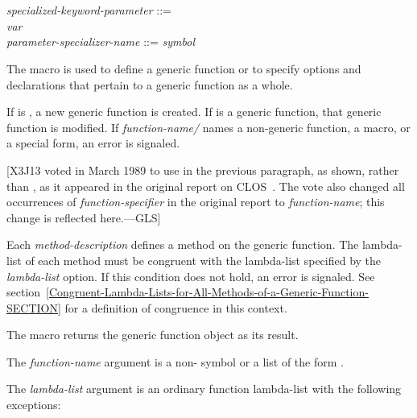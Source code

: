 \begin{defmac}
\begin{tabbing}
\> \\
\>\cd{)} \poptabs \\[2pt]
\emph{specialized-keyword-parameter\/} ::= \\
\hskip 2pc \emph{var} {\Mor} \cd{(}
       \cd{)} \\[2pt]
\emph{parameter-specializer-name\/} ::= \emph{symbol} {\Mor} 
\end{tabbing}
The macro  is used to define a generic function or to
specify options and declarations that pertain to a generic function as
a whole.

If  is , a new
generic function is created.  If  is a generic function, that generic function
is modified.  If \emph{function-name/} names a non-generic
function, a macro, or a special form, an error is signaled.

[X3J13 voted in March 1989  to use 
in the previous paragraph, as shown, rather than ,
as it appeared in the original report on CLOS~\cite{SIGPLAN-CLOS,LASC-CLOS-PART-2}.
The vote also changed all occurrences of \emph{function-specifier} in the
original report to \emph{function-name}; this change is reflected here.---GLS]

Each \emph{method-description\/} defines a method on the generic function.
The lambda-list of each method must be congruent with the lambda-list
specified by the \emph{lambda-list\/} option.  If this condition
does not hold, an error is signaled.
See section~\ref{Congruent-Lambda-Lists-for-All-Methods-of-a-Generic-Function-SECTION}
for a definition
of congruence in this context.

The macro  returns the generic function object 
as its result.




The \emph{function-name} argument is a non- symbol or a
list of the form .


The \emph{lambda-list\/} argument is an ordinary function lambda-list
with the following exceptions:


\end{defmac}
